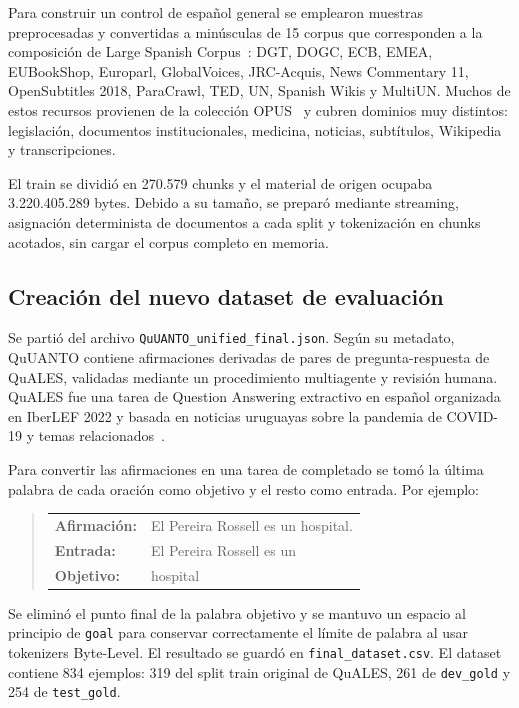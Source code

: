 \documentclass[11pt,a4paper]{article}
\newcommand{\code}[1]{\texttt{#1}}
\begin{document}
Para construir un control de español general se emplearon muestras
preprocesadas y convertidas a minúsculas de 15 corpus que corresponden a la
composición de Large Spanish Corpus~\cite{canete}: DGT, DOGC, ECB, EMEA,
EUBookShop, Europarl, GlobalVoices, JRC-Acquis, News Commentary 11,
OpenSubtitles 2018, ParaCrawl, TED, UN, Spanish Wikis y MultiUN. Muchos de estos
recursos provienen de la colección OPUS~\cite{opus} y cubren dominios muy
distintos: legislación, documentos institucionales, medicina, noticias,
subtítulos, Wikipedia y transcripciones.

El train se dividió en 270.579 chunks y el material de origen ocupaba
3.220.405.289 bytes. Debido a su tamaño, se preparó mediante streaming,
asignación determinista de documentos a cada split y tokenización en chunks
acotados, sin cargar el corpus completo en memoria.


\subsection{Creación del nuevo dataset de evaluación}

Se partió del archivo \code{QuUANTO\_unified\_final.json}. Según su metadato,
QuUANTO contiene afirmaciones derivadas de pares de pregunta-respuesta de
QuALES, validadas mediante un procedimiento multiagente y revisión humana.
QuALES fue una tarea de Question Answering extractivo en español organizada en
IberLEF 2022 y basada en noticias uruguayas sobre la pandemia de COVID-19 y
temas relacionados~\cite{rosa2022}.

Para convertir las afirmaciones en una tarea de completado se tomó la última
palabra de cada oración como objetivo y el resto como entrada. Por ejemplo:

\begin{quote}
\begin{tabular}{@{}ll@{}}
    \textbf{Afirmación:} & El Pereira Rossell es un hospital. \\
    \textbf{Entrada:} & El Pereira Rossell es un \\
    \textbf{Objetivo:} & hospital
\end{tabular}
\end{quote}

Se eliminó el punto final de la palabra objetivo y se mantuvo un espacio al
principio de \code{goal} para conservar correctamente el límite de palabra al
usar tokenizers Byte-Level. El resultado se guardó en
\code{final\_dataset.csv}. El dataset contiene 834 ejemplos: 319 del split
train original de QuALES, 261 de \code{dev\_gold} y 254 de
\code{test\_gold}.
\end{document}
